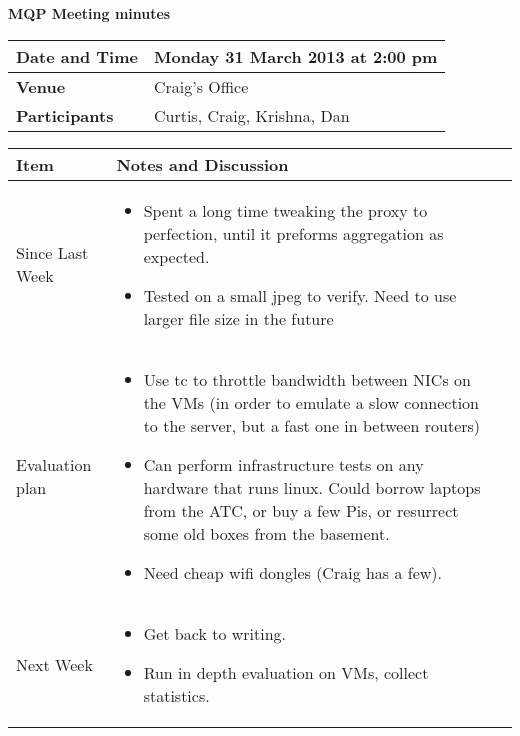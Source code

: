 \documentclass[a4wide,10pt]{extarticle}
\begin{document}
\thispagestyle{empty}

\begin{center}
\textbf{MQP Meeting minutes}
\vspace{0.33cm}
\end{center}

\begin{center}
\begin{tabular}{| m{2.8cm} | m{13.6cm} |} \hline
\textbf{Date and Time} & Monday 31 March 2013 at 2:00 pm \\ \hline
\textbf{Venue} & Craig's Office \\ \hline
\textbf{Participants} & Curtis, Craig, Krishna, Dan\\ \hline
\end{tabular}
\end{center}

\vspace{0.5cm}
\begin{center}
\begin{tabular}{| m{3.0cm} | m{12.6cm} | m{2cm}|} \hline
\textbf{Item} & \textbf{Notes and Discussion}\\ \hline

Since Last Week & 
	\begin{itemize}
		\item Spent a long time tweaking the proxy to perfection, until it preforms aggregation as expected.
		\item Tested on a small jpeg to verify. Need to use larger file size in the future
	\end{itemize} 
\\ \hline

Evaluation plan &
	\begin{itemize}
		\item Use tc to throttle bandwidth between NICs on the VMs (in order to emulate a slow connection to the server, but a fast one in between routers)
		\item Can perform infrastructure tests on any hardware that runs linux. Could borrow laptops from the ATC, or buy a few Pis, or resurrect some old boxes from the basement. 
		\item Need cheap wifi dongles (Craig has a few).
	\end{itemize}
\\ \hline
Next Week &
	\begin{itemize}
		\item Get back to writing.
		\item Run in depth evaluation on VMs, collect statistics.
	\end{itemize}
\\ \hline


\end{tabular}
\end{center}
\end{document}
